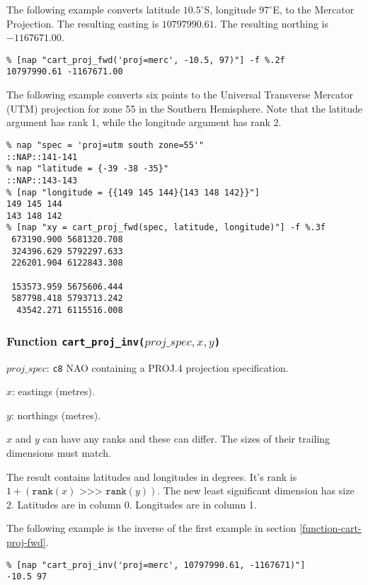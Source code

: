 The following example converts 
latitude $10.5^{\circ}$S,
longitude $97^{\circ}$E,
to the Mercator Projection.
The resulting easting is $10797990.61$.
The resulting northing is $-1167671.00$.
\begin{verbatim}
% [nap "cart_proj_fwd('proj=merc', -10.5, 97)"] -f %.2f
10797990.61 -1167671.00
\end{verbatim}

The following example converts 
six points to the Universal Transverse Mercator (UTM) projection for zone 55 in the
Southern Hemisphere.
Note that the latitude argument has rank 1, while the longitude argument has rank 2.
\begin{verbatim}
% nap "spec = 'proj=utm south zone=55'"
::NAP::141-141
% nap "latitude = {-39 -38 -35}"
::NAP::143-143
% [nap "longitude = {{149 145 144}{143 148 142}}"]
149 145 144
143 148 142
% [nap "xy = cart_proj_fwd(spec, latitude, longitude)"] -f %.3f
 673190.900 5681320.708
 324396.629 5792297.633
 226201.904 6122843.308

 153573.959 5675606.444
 587798.418 5793713.242
  43542.271 6115516.008
\end{verbatim}

\subsubsection{Function \texttt{cart\_proj\_inv(}$\mathit{proj\_spec, x, y}$\texttt{)}}
\label{function-cart-proj-inv}

\begin{simpleitems}
    \item $\mathit{proj\_spec}$: \texttt{c8} NAO containing a PROJ.4 projection specification.
    \item $\mathit{x}$: eastings (metres).
    \item $\mathit{y}$: northings (metres).
\end{simpleitems}

$\mathit{x}$ and $\mathit{y}$ can have any ranks and these can differ.
The sizes of their trailing dimensions must match.

The result contains latitudes and longitudes in degrees.
It's rank is
$1 + (\texttt{rank}(\mathit{x}) \texttt{ >>> } \texttt{rank}(\mathit{y}))$.
The new least significant dimension has size 2.
Latitudes are in column 0.  Longitudes are in column 1.

The following example is the inverse of the first example in section 
\ref{function-cart-proj-fwd}.
\begin{verbatim}
% [nap "cart_proj_inv('proj=merc', 10797990.61, -1167671)"]
-10.5 97
\end{verbatim}

